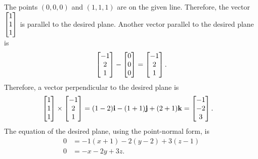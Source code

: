 \item
The points $(0,0,0)$ and $(1,1,1)$ are on the given line. Therefore, the vector $\begin{bmatrix} 1 \\ 1 \\1 \end{bmatrix}$ is parallel to the desired plane. Another vector parallel to the desired plane is 
\begin{align*}
  \begin{bmatrix} -1 \\ 2 \\ 1 \end{bmatrix} - \begin{bmatrix} 0 \\ 0 \\0 \end{bmatrix} = \begin{bmatrix} -1\\2\\1\end{bmatrix}.
\end{align*}
Therefore, a vector perpendicular to the desired plane is 
\begin{align*}
\begin{bmatrix} 1\\1\\1\end{bmatrix}  \times \begin{bmatrix}-1\\2\\1\end{bmatrix} 
&= (1-2)\mathbf{i} - (1+1)\mathbf{j}+(2+1)\mathbf{k} = \begin{bmatrix} -1 \\ -2 \\ 3 \end{bmatrix} .
\end{align*}
The equation of the desired plane, using the point-normal form, is
\begin{align*}
0&=-1(x+1)-2(y-2)+3(z-1)\\
0 &=-x - 2y +3z .
\end{align*}



